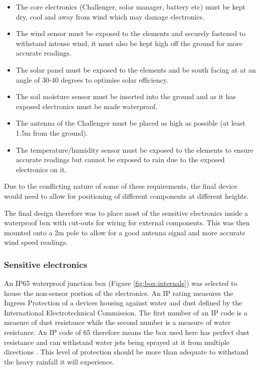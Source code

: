 \begin{itemize}
    \item The core electronics (Challenger, solar manager, battery etc) must be
          kept dry, cool and away from wind which may damage electronics.
    \item The wind sensor must be exposed to the elements and securely fastened
          to withstand intense wind, it must also be kept high off the ground
          for more accurate readings.
    \item The solar panel must be exposed to the elements and be south facing at
          at an angle of 30-40 degrees to optimise solar efficiency.
    \item The soil moisture sensor must be inserted into the ground and as it
          has exposed electronics must be made waterproof.
    \item The antenna of the Challenger must be placed as high as possible (at
          least 1.5m from the ground).
    \item The temperature/humidity sensor must be exposed to the elements to
          ensure accurate readings but cannot be exposed to rain due to the
          exposed electronics on it.
\end{itemize}

Due to the conflicting nature of some of these requirements, the final device
would need to allow for positioning of different components at different
heights.

The final design therefore was to place most of the sensitive electronics inside
a waterproof box with cut-outs for wiring for external components. This was then
mounted onto a 2m pole to allow for a good antenna signal and more accurate wind
speed readings.

\subsubsection{Sensitive electronics}

An IP65 waterproof junction box (Figure \ref{fig:box-internals}) was selected to
house the non-sensor portion of the electronics. An IP rating measures the
Ingress Protection of a devices housing against water and dust defined by the
International Electrotechnical Commission. The first number of an IP code is a
measure of dust resistance while the second number is a measure of water
resistance. An IP code of 65 therefore means the box used here has perfect dust
resistance and can withstand water jets being sprayed at it from multiple
directions \cite{wiki-ip}. This level of protection should be more than adequate
to withstand the heavy rainfall it will experience.

